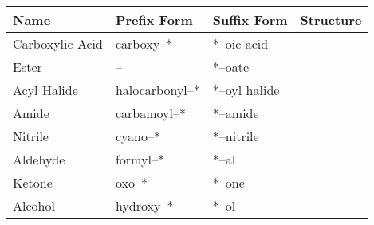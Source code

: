 \begin{center}\renewcommand{\arraystretch}{1.4}
\begin{longtabu} to \textwidth {| X[c,m] | X[c,m] | X[c,m] | X[c,m] |}

	\hline

Name			&	Prefix Form		&	Suffix Form		&	Structure \\
\hline
Carboxylic Acid	&	carboxy–*		&	*–oic acid		&
	\vspace{2mm}
	\vspace{2mm}	\\


\hline
Ester			&		–			&	*–oate			&
	\vspace{2mm}
	\vspace{2mm}	\\


\hline
Acyl Halide		&	halocarbonyl–*	&	*–oyl halide	&
	\vspace{2mm}
	\vspace{2mm}	\\


\hline
Amide			&	carbamoyl–*		&	*–amide			&
	\vspace{2mm}
	\vspace{2mm}	\\


\hline
Nitrile			&	cyano–*			&	*–nitrile		&
	\vspace{10mm}	%
	\vspace{10mm}	\\


\hline
Aldehyde		&	formyl–*		&	*–al			&
	\vspace{2mm}
	\vspace{2mm}	\\


\hline
Ketone			&	oxo–*			&	*–one			&
	\vspace{2mm}
	\vspace{2mm}	\\


\hline
Alcohol			&	hydroxy–*		&	*–ol			&
	\vspace{2mm}
	\vspace{2mm}	\\



\end{longtabu}
\end{center}
